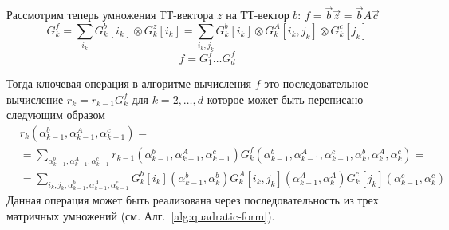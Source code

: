 Рассмотрим теперь умножения ТТ-вектора $z$ на ТТ-вектор $b$: $f = \vec{b}\vec{z} = \vec{b}A \vec{c}$
\[
G_k^f = \sum_{i_k} G_k^b[i_k] \otimes G_k^z[i_k] = \sum_{i_k, j_k} G_k^b[i_k] \otimes G_k^A[i_k, j_k] \otimes G_k^c[j_k]
\]
\[
f = G_1^f \ldots G_d^f
\]

Тогда ключевая операция в алгоритме вычисления $f$ это последовательное вычисление $r_k = r_{k-1} G_k^f$ для $k=2, \ldots, d$ которое может быть переписано следующим образом 
\begin{equation}
\begin{aligned}
&r_k(\alpha_{k-1}^b,\alpha_{k-1}^A, \alpha_{k-1}^c) = \\
&=\sum_{\alpha_{k-1}^b,\alpha_{k-1}^A, \alpha_{k-1}^c} r_{k-1}(\alpha_{k-1}^b,\alpha_{k-1}^A, \alpha_{k-1}^c) G_k^f(\alpha_{k-1}^b,\alpha_{k-1}^A, \alpha_{k-1}^c,\alpha_{k}^b,\alpha_{k}^A, \alpha_{k}^c) = \\
&=\sum_{i_k, j_k, \alpha_{k-1}^b,\alpha_{k-1}^A, \alpha_{k-1}^c} G_k^b[i_k](\alpha_{k-1}^b, \alpha_{k}^b) G_k^A[i_k, j_k](\alpha_{k-1}^A, \alpha_{k}^A) G_k^c[j_k](\alpha_{k-1}^c, \alpha_{k}^c)
\end{aligned}
\end{equation}
Данная операция может быть реализована через последовательность из трех матричных умножений (см. Алг.~\ref{alg:quadratic-form}).

